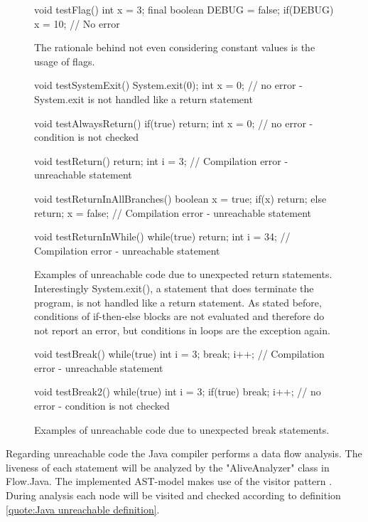\begin{figure}[h!]
	\begin{JavaCode}
void testFlag() {
	int x = 3;
	final boolean DEBUG = false;
	if(DEBUG) x = 10; // No error
}\end{JavaCode}
	\caption{The rationale behind not even considering constant values is the usage of flags.}
	\label{code:Java flags}
\end{figure}

\begin{figure}[h!]
	\begin{JavaCode}
void testSystemExit() {
	System.exit(0);
	int x = 0; // no error - System.exit is not handled like a return statement
}

void testAlwaysReturn() {
	if(true) return;
	int x = 0; // no error - condition is not checked
}

void testReturn() {
	return;
	int i = 3; // Compilation error - unreachable statement
}

void testReturnInAllBranches() {
	boolean x = true;
	if(x) return;
	else return;
	x = false; // Compilation error - unreachable statement
}

void testReturnInWhile() {
	while(true) {
		return;
	}
	int i = 34; // Compilation error - unreachable statement
}\end{JavaCode}
	\caption{Examples of unreachable code due to unexpected return statements. Interestingly System.exit(), a statement that does terminate the program, is not handled like a return statement. As stated before, conditions of if-then-else blocks are not evaluated and therefore do not report an error, but conditions in loops are the exception again. }
	\label{code:Java unexpected return}
\end{figure}

\begin{figure}[h!]
	\begin{JavaCode}
void testBreak() {
	while(true) {
		int i = 3;
		break; 
		i++; // Compilation error - unreachable statement
	}
}

void testBreak2() {
	while(true) {
		int i = 3;
		if(true) break; 
		i++; // no error - condition is not checked
	}
}\end{JavaCode}
	\caption{Examples of unreachable code due to unexpected break statements.}
	\label{code:Java unexpected break}
\end{figure}

Regarding unreachable code the Java compiler performs a data flow analysis. The liveness of each statement will be analyzed by the "AliveAnalyzer" class in Flow.Java. The implemented AST-model makes use of the visitor pattern \cite{gammaDesignPatternsElements}. During analysis each node will be visited and checked according to definition \ref{quote:Java unreachable definition}.



